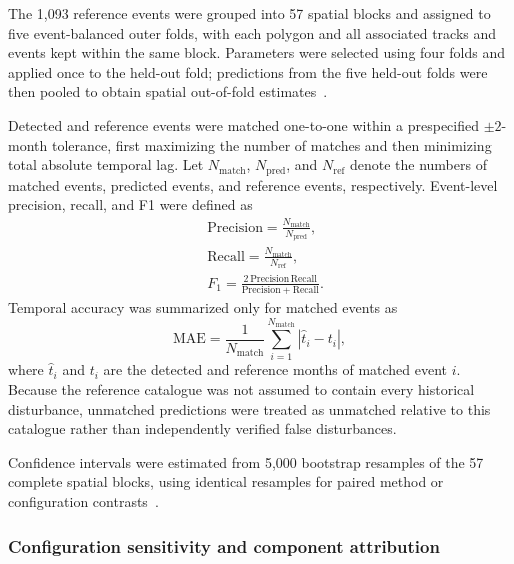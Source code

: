 The 1,093 reference events were grouped into 57 spatial blocks and assigned to five event-balanced outer folds, with each polygon and all associated tracks and events kept within the same block. Parameters were selected using four folds and applied once to the held-out fold; predictions from the five held-out folds were then pooled to obtain spatial out-of-fold estimates~\citep{Roberts2017SpatialCV}. 

Detected and reference events were matched one-to-one within a prespecified $\pm2$-month tolerance, first maximizing the number of matches and then minimizing total absolute temporal lag. Let $N_{\mathrm{match}}$, $N_{\mathrm{pred}}$, and $N_{\mathrm{ref}}$ denote the numbers of matched events, predicted events, and reference events, respectively. Event-level precision, recall, and F1 were defined as
\begin{align}
    &\mathrm{Precision}
    =
    \frac{N_{\mathrm{match}}}{N_{\mathrm{pred}}},
    \label{eq:precision}
    \\
    &\mathrm{Recall}
    =
    \frac{N_{\mathrm{match}}}{N_{\mathrm{ref}}},
    \label{eq:recall}
    \\
    &F_1
    =
    \frac{
        2\,\mathrm{Precision}\,\mathrm{Recall}
    }{
        \mathrm{Precision}+\mathrm{Recall}
    }.
    \label{eq:f1_score}
\end{align}
Temporal accuracy was summarized only for matched events as
\begin{equation}
    \mathrm{MAE}
    =
    \frac{1}{N_{\mathrm{match}}}
    \sum_{i=1}^{N_{\mathrm{match}}}
    \left|\hat{t}_i-t_i\right|,
    \label{eq:temporal_mae}
\end{equation}
where $\hat{t}_i$ and $t_i$ are the detected and reference months of matched event $i$. Because the reference catalogue was not assumed to contain every historical disturbance, unmatched predictions were treated as unmatched relative to this catalogue rather than independently verified false disturbances.

Confidence intervals were estimated from 5,000 bootstrap resamples of the 57 complete spatial blocks, using identical resamples for paired method or configuration contrasts~\citep{Davison1997Bootstrap}.


\subsubsection{Configuration sensitivity and component attribution}
\label{sec:configuration_component}

